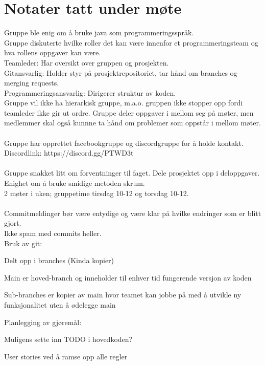 \documentclass[letterpaper,11pt]{article}
\begin{document}
\section*{Notater tatt under møte}
Gruppe ble enig om å bruke java som programmeringsspråk.\\
Gruppe diskuterte hvilke roller det kan være innenfor et programmeringsteam og hva rollens oppgaver kan være.\\
Teamleder: Har oversikt over gruppen og prosjekten.\\
Gitansvarlig: Holder styr på prosjektrepositoriet, tar hånd om branches og merging requests.\\
Programmeringsansvarlig: Dirigerer struktur av koden.\\
Gruppe vil ikke ha hierarkisk gruppe, m.a.o. gruppen ikke stopper opp fordi teamleder ikke gir ut ordre. Gruppe deler oppgaver i mellom seg på møter, men medlemmer skal også kunnne ta hånd om problemer som oppstår i mellom møter.\\\\
Gruppe har opprettet facebookgruppe og discordgruppe for å holde kontakt.\\
Discordlink: https://discord.gg/PTWD3t\\\\
Gruppe snakket litt om forventninger til faget. Dele prosjektet opp i deloppgaver.\\
Enighet om å bruke smidige metoden skrum.\\
2 møter i uken; gruppetime tirsdag 10-12 og torsdag 10-12.\\\\
Commitmeldinger bør være entydige og være klar på hvilke endringer som er blitt gjort.\\
Ikke spam med commits heller.\\
Bruk av git:
\begin{list}{}{}
	\item Delt opp i branches (Kinda kopier)
	\item \begin{list}{}{}
			\item Main er hoved-branch og inneholder til enhver tid fungerende versjon av koden
			\item Sub-branches er kopier av main hvor teamet kan jobbe på med å utvikle ny funksjonalitet uten å ødelegge main
		\end{list}
\end{list}


Planlegging av gjøremål:
\begin{list}{}{}
	\item Muligens sette inn TODO i hovedkoden?
	\item User stories ved å ramse opp alle regler
\end{list}
\end{document}

